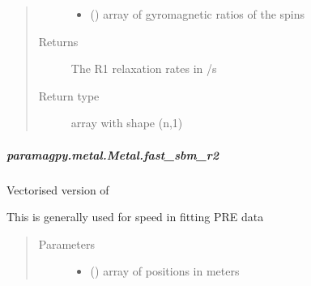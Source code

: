 \documentclass[a4paper,10pt,english,openany,oneside]{sphinxmanual}
\begin{document}
\begin{fulllineitems}
\begin{fulllineitems}
\begin{fulllineitems}
\begin{quote}
\begin{description}
\begin{itemize}
\item {} 
 (\sphinxstyleliteralemphasis{\sphinxupquote{ (}}\sphinxstyleliteralemphasis{\sphinxupquote{,}}\sphinxstyleliteralemphasis{\sphinxupquote{)}}) \textendash{} array of gyromagnetic ratios of the spins

\end{itemize}

\item[{Returns}] \leavevmode
{} \textendash{} The R1 relaxation rates in /s

\item[{Return type}] \leavevmode
array with shape (n,1)

\end{description}\end{quote}

\end{fulllineitems}



\subparagraph{paramagpy.metal.Metal.fast\_sbm\_r2}
\label{\detokenize{reference/generated/paramagpy.metal.Metal.fast_sbm_r2:paramagpy-metal-metal-fast-sbm-r2}}\label{\detokenize{reference/generated/paramagpy.metal.Metal.fast_sbm_r2::doc}}

\begin{fulllineitems}
\label{\detokenize{reference/generated/paramagpy.metal.Metal.fast_sbm_r2:paramagpy.metal.Metal.fast_sbm_r2}}
Vectorised version of {\hyperref[\detokenize{reference/generated/paramagpy.metal.Metal.sbm_r2:paramagpy.metal.Metal.sbm_r2}]{}}

This is generally used for speed in fitting PRE data
\begin{quote}\begin{description}
\item[{Parameters}] \leavevmode\begin{itemize}
\item {} 
 (\sphinxstyleliteralemphasis{\sphinxupquote{ (}}\sphinxstyleliteralemphasis{\sphinxupquote{,}}\sphinxstyleliteralemphasis{\sphinxupquote{)}}) \textendash{} array of positions in meters


\end{itemize}
\end{description}
\end{quote}
\end{fulllineitems}
\end{fulllineitems}
\end{fulllineitems}
\end{document}
